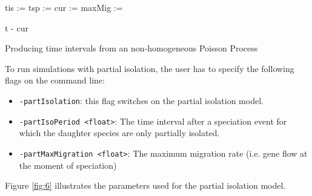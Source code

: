 \begin{algorithm}

  tis := \;
  tsp := \;
  cur := \;
  maxMig := \;
  
  \Return t - cur
  
  \vspace{5pt}
  
  \caption{Producing time intervals from an non-homogeneous Poisson Process}
  
  \label{code:1}

\end{algorithm}


To run simulations with partial isolation, the user has to specify the following flags on the command line:

\begin{itemize}
\item \verb!-partIsolation!:  this flag switches on the partial isolation model.
\item \verb!-partIsoPeriod <float>!: The time interval after a speciation event for which the daughter species are only partially isolated.
\item \verb!-partMaxMigration <float>!: The maximum migration rate (i.e. gene flow at the moment of speciation)
\end{itemize}

Figure \ref{fig:6} illustrates the parameters used for the partial isolation model.



